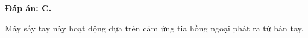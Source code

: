 \begin{enumerate}[label=\bfseries Câu \arabic*:]
{\begin{mcq}
		\end{mcq}
	}
	
	\loigiai
	{		\textbf{Đáp án: C.}
		
		Máy sấy tay này hoạt động dựa trên cảm ứng tia hồng ngoại phát ra từ bàn tay. 
	}
\end{enumerate}

